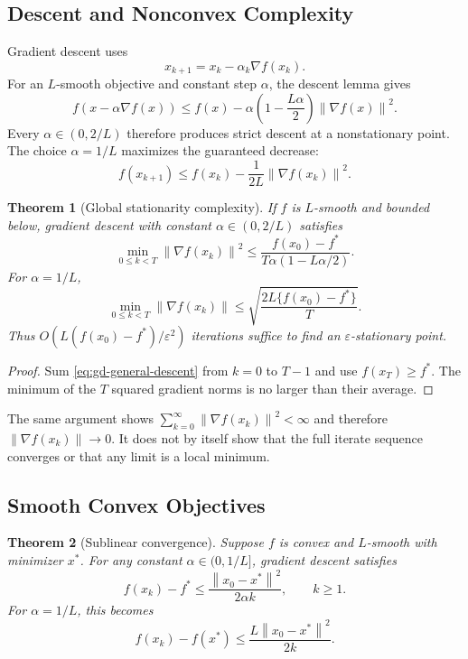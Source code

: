 \documentclass[12pt,oneside]{book}
\numberwithin{equation}{section}
\theoremstyle{definition}
\theoremstyle{plain}
\newtheorem{theorem}{Theorem}[section]
\theoremstyle{remark}
\newcommand{\norm}[1]{\left\lVert #1 \right\rVert}
\newcommand{\grad}{\nabla}
\begin{document}
\subsection{Descent and Nonconvex Complexity}

Gradient descent uses
\begin{equation}
    x_{k+1}=x_k-\alpha_k\grad f(x_k).
    \label{eq:gradient-descent}
\end{equation}
For an $L$-smooth objective and constant step $\alpha$, the descent lemma gives
\begin{equation}
 f(x-\alpha\grad f(x))
 \leq f(x)-\alpha\left(1-\frac{L\alpha}{2}\right)
 \norm{\grad f(x)}^2.
 \label{eq:gd-general-descent}
\end{equation}
Every $\alpha\in(0,2/L)$ therefore produces strict descent at a nonstationary
point. The choice $\alpha=1/L$ maximizes the guaranteed decrease:
\[
    f(x_{k+1})\leq f(x_k)-\frac1{2L}\norm{\grad f(x_k)}^2.
\]

\begin{theorem}[Global stationarity complexity]
If $f$ is $L$-smooth and bounded below, gradient descent with constant
$\alpha\in(0,2/L)$ satisfies
\begin{equation}
 \min_{0\leq k<T}\norm{\grad f(x_k)}^2
 \leq
 \frac{f(x_0)-f^*}{T\alpha(1-L\alpha/2)}.
 \label{eq:gd-nonconvex-rate}
\end{equation}
For $\alpha=1/L$,
\[
 \min_{0\leq k<T}\norm{\grad f(x_k)}
 \leq\sqrt{\frac{2L\{f(x_0)-f^*\}}{T}}.
\]
Thus $O(L(f(x_0)-f^*)/\varepsilon^2)$ iterations suffice to find an
$\varepsilon$-stationary point.
\end{theorem}

\begin{proof}
Sum \cref{eq:gd-general-descent} from $k=0$ to $T-1$ and use
$f(x_T)\geq f^*$. The minimum of the $T$ squared gradient norms is no larger
than their average.
\end{proof}

The same argument shows
$\sum_{k=0}^\infty\norm{\grad f(x_k)}^2<\infty$ and therefore
$\norm{\grad f(x_k)}\to0$. It does not by itself show that the full iterate
sequence converges or that any limit is a local minimum.

\subsection{Smooth Convex Objectives}

\begin{theorem}[Sublinear convergence]
Suppose $f$ is convex and $L$-smooth with minimizer $x^*$. For any constant
$\alpha\in(0,1/L]$, gradient descent satisfies
\begin{equation}
 f(x_k)-f^*\leq\frac{\norm{x_0-x^*}^2}{2\alpha k},
 \qquad k\geq1.
 \label{eq:gd-convex-rate}
\end{equation}
For $\alpha=1/L$, this becomes
\[
 f(x_k)-f(x^*)\leq\frac{L\norm{x_0-x^*}^2}{2k}.
\]
\end{theorem}
\end{document}
